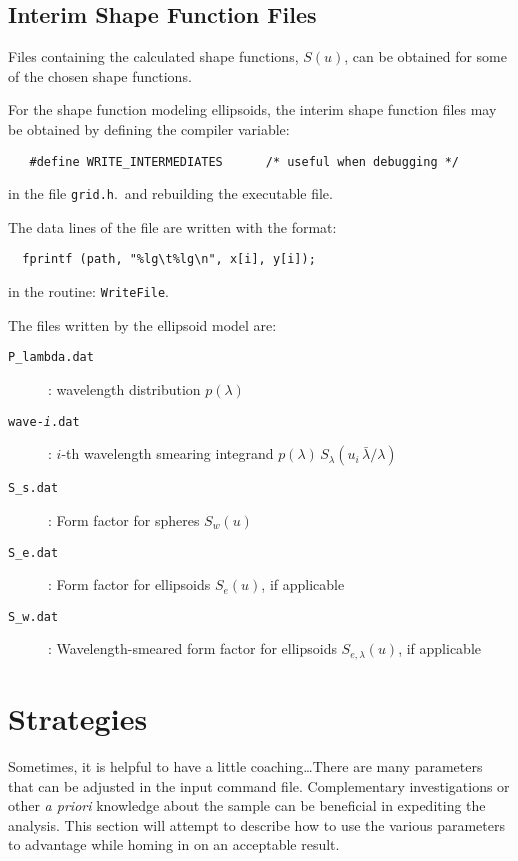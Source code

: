 \documentclass[letterpaper]{article}
\begin{document}
\subsection{Interim Shape Function Files}

Files containing the calculated shape functions, $S(u)$, can
be obtained for some of the chosen shape functions.

For the shape function modeling ellipsoids, the interim
shape function files may be obtained by defining the
compiler variable:
\begin{verbatim}
   #define WRITE_INTERMEDIATES      /* useful when debugging */
\end{verbatim} 
in the file \texttt{grid.h}.\ and rebuilding the 
executable file.

The data lines of the file are written with the format:
\begin{verbatim}
  fprintf (path, "%lg\t%lg\n", x[i], y[i]);
\end{verbatim}
in the routine: \texttt{WriteFile}.

The files written by the ellipsoid model are:
\begin{description}
   \item[\texttt{P\_lambda.dat}]: wavelength distribution $p(\lambda)$
   \item[\texttt{wave-\emph{i}.dat}]: $i$-th wavelength 
             smearing integrand $p(\lambda) \, 
             S_\lambda(u_i \, \bar{\lambda}/\lambda)$
   \item[\texttt{S\_s.dat}]: Form factor for spheres $S_w(u)$
   \item[\texttt{S\_e.dat}]: Form factor for 
             ellipsoids $S_e(u)$, if applicable
   \item[\texttt{S\_w.dat}]: Wavelength-smeared form factor for 
             ellipsoids $S_{e,\lambda}(u)$, if applicable
\end{description}

\section{Strategies}

Sometimes, it is helpful to have a little 
coaching\dots\quad There are many parameters that can be 
adjusted in the input command file.  Complementary 
investigations or other \emph{a priori} knowledge about 
the sample can be beneficial in expediting the analysis.
This section will attempt to describe how to use the 
various parameters to advantage while homing in on an 
acceptable result.
\end{document}
